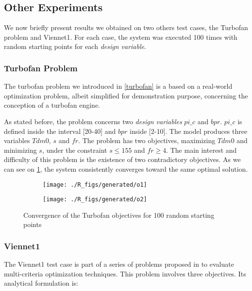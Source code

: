 \subsection{Other Experiments}

We now briefly present results we obtained on two others test cases, the Turbofan problem and Viennet1. For each case, the system was executed 100 times with random starting points for each \emph{design variable}.

\subsubsection{Turbofan Problem}

The turbofan problem we introduced in \figurename \ref{turbofan} is a based on a real-world optimization problem, albeit simplified for demonstration purpose, concerning the conception of a turbofan engine.

As stated before, the problem concerns two \emph{design variables} $pi\_c$ and $bpr$. $pi\_c$ is defined inside the interval [20-40] and $bpr$ inside [2-10]. The model produces three variables $Tdm0$, $s$ and $fr$.
The problem has two objectives, maximizing  $Tdm0$ and minimizing $s$, under the constraint \(s \leq 155\) and \(fr \geq 4\).
The main interest and difficulty of this problem is the existence of two contradictory objectives.
As we can see on \figurename \ref{snecma_res}, the system consistently converges toward the same optimal solution.

\begin{figure}[h]
	\begin{subfigure}[b]{0.49\textwidth}
		\centering
		\texttt{[image: ./R\_figs/generated/o1]}	
	\end{subfigure}
	\hfill%
	\begin{subfigure}[b]{0.49\textwidth}
		\centering
		\texttt{[image: ./R\_figs/generated/o2]}	
	\end{subfigure}
	\caption{Convergence of the Turbofan objectives for 100 random starting points}
	\label{snecma_res}
\end{figure}

\subsubsection{Viennet1}

The Viennet1 test case is part of a series of problems proposed in \cite{viennet1996multicriteria} to evaluate multi-criteria optimization techniques. This problem involves three objectives. Its analytical formulation is:


